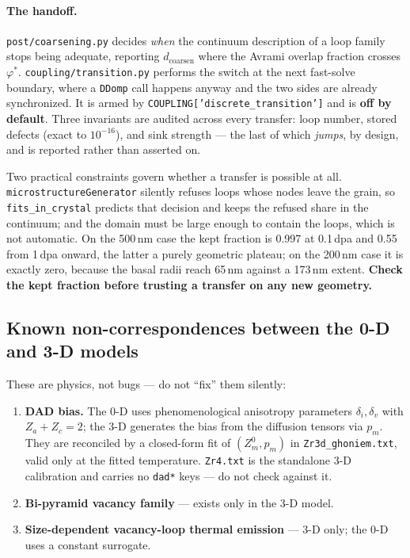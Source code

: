 \documentclass[11pt]{article}
\newcommand{\code}[1]{\texttt{\small #1}}
\newcommand{\file}[1]{\texttt{\footnotesize #1}}
\begin{document}
\paragraph{The handoff.} \file{post/coarsening.py} decides \emph{when} the
continuum description of a loop family stops being adequate, reporting
$d_{\text{coarsen}}$ where the Avrami overlap fraction crosses $\varphi^\ast$.
\file{coupling/transition.py} performs the switch at the next fast-solve
boundary, where a \code{DDomp} call happens anyway and the two sides are
already synchronized. It is armed by \code{COUPLING['discrete\_transition']}
and is \textbf{off by default}. Three invariants are audited across every
transfer: loop number, stored defects (exact to $10^{-16}$), and sink
strength --- the last of which \emph{jumps}, by design, and is reported rather
than asserted on.

Two practical constraints govern whether a transfer is possible at all.
\code{microstructureGenerator} silently refuses loops whose nodes leave the
grain, so \code{fits\_in\_crystal} predicts that decision and keeps the refused
share in the continuum; and the domain must be large enough to contain the
loops, which is not automatic. On the 500\,nm case the kept fraction is 0.997
at 0.1\,dpa and 0.55 from 1\,dpa onward, the latter a purely geometric plateau;
on the 200\,nm case it is exactly zero, because the basal radii reach 65\,nm
against a 173\,nm extent. \textbf{Check the kept fraction before trusting a
transfer on any new geometry.}

\subsection{Known non-correspondences between the 0-D and 3-D models}
\label{sec:noncorr}

These are physics, not bugs --- do not ``fix'' them silently:

\begin{enumerate}
\item \textbf{DAD bias.} The 0-D uses phenomenological anisotropy parameters
$\delta_i, \delta_v$ with $Z_a + Z_c = 2$; the 3-D generates the bias from
the diffusion tensors via $p_m$. They are reconciled by a closed-form fit of
$(Z^0_m, p_m)$ in \file{Zr3d\_ghoniem.txt}, valid only at the fitted
temperature. \file{Zr4.txt} is the standalone 3-D calibration and carries no
\code{dad*} keys --- do not check against it.
\item \textbf{Bi-pyramid vacancy family} --- exists only in the 3-D model.
\item \textbf{Size-dependent vacancy-loop thermal emission} --- 3-D only;
the 0-D uses a constant surrogate.
\end{enumerate}
\end{document}
